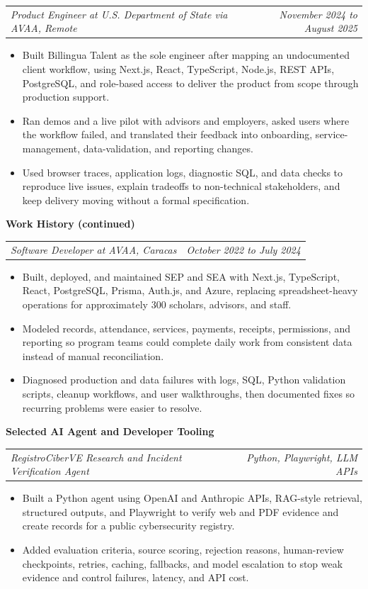 \documentclass[10pt,letterpaper]{article}
\makeatletter
\newcommand{\bodyfont}{\fontsize{10.5}{15.75}\selectfont}
\newcommand{\sectiontitle}[1]{%
  \vspace{4pt}
  {\bodyfont\textbf{#1}}\par
  \nopagebreak[4]
  \vspace{2pt}
}
\newcommand{\roleline}[2]{%
  \begin{tabularx}{\textwidth}{@{}Xr@{}}
    \bodyfont\textit{#1} & \bodyfont\textit{#2}
  \end{tabularx}
  \nopagebreak[4]
  \vspace{1pt}
}
\makeatother
\begin{document}
\vspace{3pt}
\roleline{Product Engineer at U.S. Department of State via AVAA, Remote}{November 2024 to August 2025}
\begin{itemize}
  \item Built Billingua Talent as the sole engineer after mapping an undocumented client workflow, using Next.js, React, TypeScript, Node.js, REST APIs, PostgreSQL, and role-based access to deliver the product from scope through production support.
  \item Ran demos and a live pilot with advisors and employers, asked users where the workflow failed, and translated their feedback into onboarding, service-management, data-validation, and reporting changes.
  \item Used browser traces, application logs, diagnostic SQL, and data checks to reproduce live issues, explain tradeoffs to non-technical stakeholders, and keep delivery moving without a formal specification.
\end{itemize}

\newpage
\sectiontitle{Work History (continued)}

\roleline{Software Developer at AVAA, Caracas}{October 2022 to July 2024}
\begin{itemize}
  \item Built, deployed, and maintained SEP and SEA with Next.js, TypeScript, React, PostgreSQL, Prisma, Auth.js, and Azure, replacing spreadsheet-heavy operations for approximately 300 scholars, advisors, and staff.
  \item Modeled records, attendance, services, payments, receipts, permissions, and reporting so program teams could complete daily work from consistent data instead of manual reconciliation.
  \item Diagnosed production and data failures with logs, SQL, Python validation scripts, cleanup workflows, and user walkthroughs, then documented fixes so recurring problems were easier to resolve.
\end{itemize}

\sectiontitle{Selected AI Agent and Developer Tooling}

\roleline{RegistroCiberVE Research and Incident Verification Agent}{Python, Playwright, LLM APIs}
\begin{itemize}
  \item Built a Python agent using OpenAI and Anthropic APIs, RAG-style retrieval, structured outputs, and Playwright to verify web and PDF evidence and create records for a public cybersecurity registry.
  \item Added evaluation criteria, source scoring, rejection reasons, human-review checkpoints, retries, caching, fallbacks, and model escalation to stop weak evidence and control failures, latency, and API cost.
\end{itemize}
\end{document}
